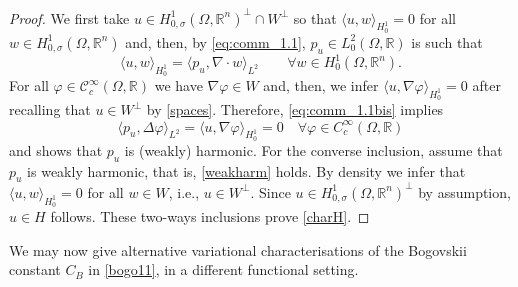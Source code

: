 \documentclass[11pt]{article}
\theoremstyle{plain}
\theoremstyle{definition}
\numberwithin{equation}{section}
\newcommand{\R}{\mathbb{R}}
\begin{document}
\noindent
\begin{proof} We first take $u\in H^1_{0,\sigma}(\Omega,\R^n)^\perp\cap W^\perp$ so that $\langle u,w\rangle_{H^1_0}=0$ for all $w\in H^1_{0,\sigma}(\Omega,\R^n)$ and, then, by \eqref{eq:comm_1.1}, $p_u\in L^2_0 (\Omega,\R)$ is such that
\begin{equation}\label{eq:comm_1.1bis}
\langle  u,w\rangle_{H^1_0} =\langle p_u,\nabla \cdot w \rangle_{L^2}\qquad\forall w\in  H^1_0(\Omega,\R^n).
\end{equation}
For all $\varphi\in \mathcal{C}^\infty_c(\Omega,\R)$ we have $\nabla \varphi \in W$ and, then, we infer $\langle u,\nabla \varphi\rangle_{H^1_0}=0$
after recalling that $u\in W^\perp$ by \eqref{spaces}. Therefore, \eqref{eq:comm_1.1bis} implies
\begin{equation}\label{weakharm}
\langle p_u,\Delta \varphi\rangle_{L^2}=\langle u,\nabla \varphi\rangle_{H^1_0}=0\quad\forall \varphi\in C^\infty_c(\Omega,\R)
\end{equation}
and shows that $p_u$ is (weakly) harmonic.
For the converse inclusion, assume that $p_u$ is weakly harmonic, that is, \eqref{weakharm} holds.
By density we infer that $\langle u, w\rangle_{H^1_0}=0$ for all $w\in W$, i.e., $u\in W^\perp$. Since $u\in H^1_{0,\sigma}(\Omega,\R^n)^\perp$
by assumption, $u\in H$ follows. These two-ways inclusions prove \eqref{charH}.
\end{proof}

We may now give  alternative variational characterisations of the Bogovskii constant $C_B$ in
\eqref{bogo11}, in a different functional setting.
\end{document}
